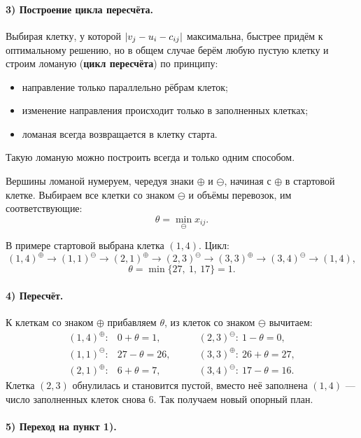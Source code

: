 \paragraph{3) Построение цикла пересчёта.}
Выбирая клетку, у которой $\left\lvert v_j - u_i - c_{ij} \right\rvert$ максимальна, быстрее придём
к оптимальному решению, но в общем случае берём любую пустую клетку и строим
ломаную (\textbf{цикл пересчёта}) по принципу:
\begin{itemize}[nosep,left=0pt]
  \item направление только параллельно рёбрам клеток;
  \item изменение направления происходит только в заполненных клетках;
  \item ломаная всегда возвращается в клетку старта.
\end{itemize}
Такую ломаную можно построить всегда и только одним способом.

Вершины ломаной нумеруем, чередуя знаки $\oplus$ и $\ominus$, начиная с $\oplus$
в стартовой клетке. Выбираем все клетки со знаком $\ominus$ и объёмы перевозок,
им соответствующие:
\[
  \theta = \min_{\ominus} x_{ij} .
\]


В примере стартовой выбрана клетка $(1,4)$. Цикл:
\[
  (1,4)^{\oplus} \to (1,1)^{\ominus} \to (2,1)^{\oplus} \to (2,3)^{\ominus}
  \to (3,3)^{\oplus} \to (3,4)^{\ominus} \to (1,4) ,
\]
\[
  \theta = \min\{27,\ 1,\ 17\} = 1 .
\]

\paragraph{4) Пересчёт.}
К клеткам со знаком $\oplus$ прибавляем $\theta$, из клеток со знаком $\ominus$
вычитаем:
\[
  \begin{array}{lll}
    (1,4)^{\oplus}: & 0 + \theta = 1, &\qquad
    (2,3)^{\ominus}: \ 1 - \theta = 0, \\
    (1,1)^{\ominus}: & 27 - \theta = 26, &\qquad
    (3,3)^{\oplus}: \ 26 + \theta = 27, \\
    (2,1)^{\oplus}: & 6 + \theta = 7, &\qquad
    (3,4)^{\ominus}: \ 17 - \theta = 16 .
  \end{array}
\]
Клетка $(2,3)$ обнулилась и становится пустой, вместо неё заполнена $(1,4)$ —
число заполненных клеток снова $6$. Так получаем новый опорный план.

\paragraph{5) Переход на пункт 1).}

